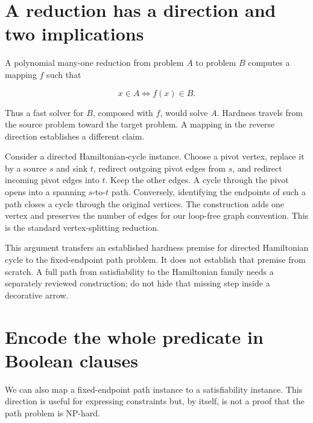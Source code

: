 \section{A reduction has a direction and two
implications}\label{a-reduction-has-a-direction-and-two-implications}

A polynomial many-one reduction from problem \(A\) to problem \(B\)
computes a mapping \(f\) such that

\begin{equation}
x\in A\iff f(x)\in B.
\end{equation}

Thus a fast solver for \(B\), composed with \(f\), would solve \(A\).
Hardness travels from the source problem toward the target problem. A
mapping in the reverse direction establishes a different claim.

Consider a directed Hamiltonian-cycle instance. Choose a pivot vertex,
replace it by a source \(s\) and sink \(t\), redirect outgoing pivot
edges from \(s\), and redirect incoming pivot edges into \(t\). Keep the
other edges. A cycle through the pivot opens into a spanning
\(s\)-to-\(t\) path. Conversely, identifying the endpoints of such a
path closes a cycle through the original vertices. The construction adds
one vertex and preserves the number of edges for our loop-free graph
convention. This is the standard vertex-splitting reduction.\cite{MIT6046Rec8}


This argument transfers an established hardness premise for directed
Hamiltonian cycle to the fixed-endpoint path problem. It does not
establish that premise from scratch. A full path from satisfiability to
the Hamiltonian family needs a separately reviewed construction; do not
hide that missing step inside a decorative arrow.

\section{Encode the whole predicate in Boolean
clauses}\label{encode-the-whole-predicate-in-boolean-clauses}

We can also map a fixed-endpoint path instance to a satisfiability
instance. This direction is useful for expressing constraints but, by
itself, is not a proof that the path problem is NP-hard.

